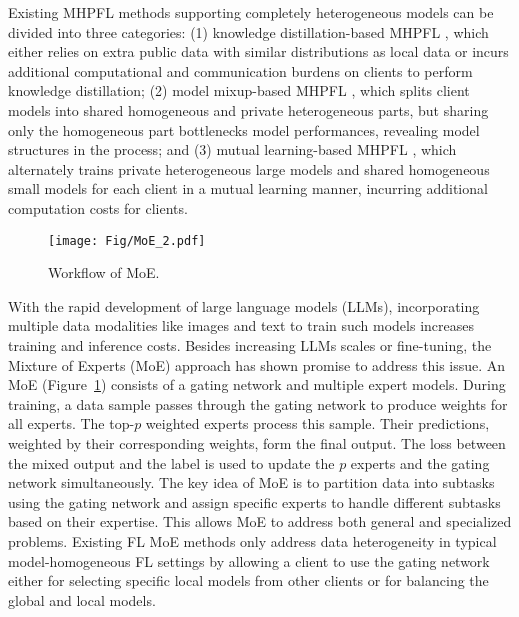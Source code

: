 \documentclass[sigconf]{acmart}
\newcommand{\hetero}{heterogeneous }
\newcommand{\homo}{homogeneous }
\newcommand{\heteroN}{heterogeneity }
\begin{document}
Existing MHPFL methods supporting completely \hetero models can be divided into three categories: (1) knowledge distillation-based MHPFL \citep{FedProto}, which either relies on extra public data with similar distributions as local data
or incurs additional computational and communication burdens on clients to perform knowledge distillation; (2) model mixup-based MHPFL \citep{LG-FedAvg}, which splits client models into shared homogeneous and private heterogeneous parts, but sharing only the homogeneous part bottlenecks model performances, revealing model structures in the process; and (3) mutual learning-based MHPFL \citep{FedKD}, which alternately trains private heterogeneous large models and shared homogeneous small models for each client in a mutual learning manner, incurring additional computation costs for clients. 

\begin{figure}[!t]
\centering
\texttt{[image: Fig/MoE\_2.pdf]}
\caption{Workflow of MoE.}
\vspace{-1em}
\label{fig:MoE}
\vspace{-1em}
\end{figure}

With the rapid development of large language models (LLMs), incorporating multiple data modalities like images and text to train such models increases training and inference costs. Besides increasing LLMs scales or fine-tuning, the Mixture of Experts (MoE) approach has shown promise to address this issue. An MoE (Figure~\ref{fig:MoE}) consists of a gating network and multiple expert models. During training, a data sample passes through the gating network to produce weights for all experts. The top-$p$ weighted experts process this sample. Their predictions, weighted by their corresponding weights, form the final output. The loss between the mixed output and the label is used to update the $p$ experts and the gating network simultaneously. The key idea of MoE is to partition data into subtasks using the gating network and assign specific experts to handle different subtasks based on their expertise. This allows MoE to address both general and specialized problems. 
Existing FL MoE methods only address data \heteroN in typical model-\homo FL settings by allowing a client to use the gating network either for selecting specific local models from other clients or for balancing the global and local models.
\end{document}
